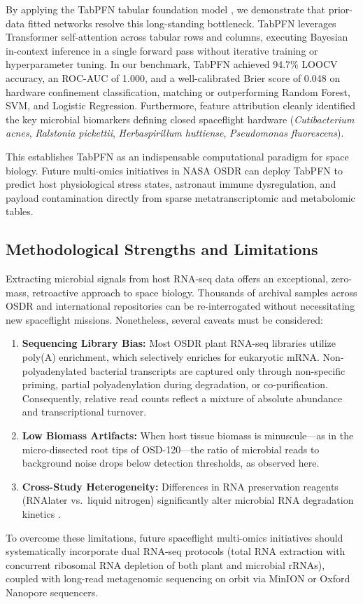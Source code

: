 By applying the TabPFN tabular foundation model \citep{hollmann2025accurate}, we demonstrate that prior-data fitted networks resolve this long-standing bottleneck. TabPFN leverages Transformer self-attention across tabular rows and columns, executing Bayesian in-context inference in a single forward pass without iterative training or hyperparameter tuning. In our benchmark, TabPFN achieved 94.7\% LOOCV accuracy, an ROC-AUC of 1.000, and a well-calibrated Brier score of 0.048 on hardware confinement classification, matching or outperforming Random Forest, SVM, and Logistic Regression. Furthermore, feature attribution cleanly identified the key microbial biomarkers defining closed spaceflight hardware (\textit{Cutibacterium acnes}, \textit{Ralstonia pickettii}, \textit{Herbaspirillum huttiense}, \textit{Pseudomonas fluorescens}).

This establishes TabPFN as an indispensable computational paradigm for space biology. Future multi-omics initiatives in NASA OSDR can deploy TabPFN to predict host physiological stress states, astronaut immune dysregulation, and payload contamination directly from sparse metatranscriptomic and metabolomic tables.

\subsection{Methodological Strengths and Limitations}
Extracting microbial signals from host RNA-seq data offers an exceptional, zero-mass, retroactive approach to space biology. Thousands of archival samples across OSDR and international repositories can be re-interrogated without necessitating new spaceflight missions. Nonetheless, several caveats must be considered:
\begin{enumerate}
    \item \textbf{Sequencing Library Bias:} Most OSDR plant RNA-seq libraries utilize poly(A) enrichment, which selectively enriches for eukaryotic mRNA. Non-polyadenylated bacterial transcripts are captured only through non-specific priming, partial polyadenylation during degradation, or co-purification. Consequently, relative read counts reflect a mixture of absolute abundance and transcriptional turnover.
    \item \textbf{Low Biomass Artifacts:} When host tissue biomass is minuscule—as in the micro-dissected root tips of OSD-120—the ratio of microbial reads to background noise drops below detection thresholds, as observed here.
    \item \textbf{Cross-Study Heterogeneity:} Differences in RNA preservation reagents (RNAlater vs.\ liquid nitrogen) significantly alter microbial RNA degradation kinetics \citep{kruse2017transcriptome}.
\end{enumerate}

To overcome these limitations, future spaceflight multi-omics initiatives should systematically incorporate dual RNA-seq protocols (total RNA extraction with concurrent ribosomal RNA depletion of both plant and microbial rRNAs), coupled with long-read metagenomic sequencing on orbit via MinION or Oxford Nanopore sequencers.

